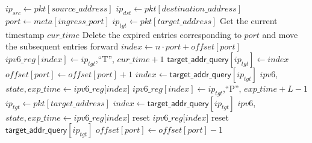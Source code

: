 \documentclass[journal]{IEEEtran}
\begin{document}
\begin{algorithm}[!t]
\begin{algorithmic}[1]
            \State $ip_{src} \gets pkt[source\_address]$
            \State $ip_{dst} \gets pkt[destination\_address]$
            \State $port \gets meta[ingress\_port]$
                \State $ip_{tgt} \gets pkt[target\_address]$
                \State Get the current timestamp $cur\_time$
                        \State Delete the expired entries corresponding to $port$ and move the subsequent entries forward
                        \State $index \gets n \cdot port + of\!fset[port]$
                        \State $ipv6\_reg[index] \gets ip_{tgt}$,``T'', $cur\_time + 1$
                        \State $\mathsf{target\_addr\_query}[ip_{tgt}] \gets index$
                        \State $of\!fset[port] \gets of\!fset[port] + 1$
                    \EndIf
                \Else
                    \State $index \gets \mathsf{target\_addr\_query}[ip_{tgt}]$
                    \State $ipv6$, $state, exp\_time \gets ipv6\_reg$[$index$]
                        \State $ipv6\_reg[index] \gets ip_{tgt}$,``P'', $exp\_time + L - 1$
                    \EndIf
                \EndIf
                    \State $ip_{tgt} \gets pkt[target\_address]$ 
                        \State $index \gets \mathsf{target\_addr\_query}[ip_{tgt}]$
                        \State $ipv6$, $state, exp\_time \gets ipv6\_reg$[$index$]
                            \State reset $ipv6\_reg$[$index$]
                            \State reset $\mathsf{target\_addr\_query}[ip_{tgt}]$
                            \State $of\!fset[port] \gets of\!fset[port] - 1$
                        \EndIf
                    \EndIf
                \EndIf
            \EndIf
            \end{algorithmic}
        \end{algorithm}
\end{document}
